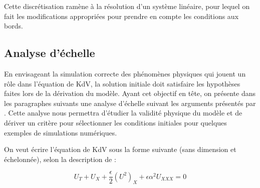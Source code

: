 \indent Cette discrétisation ramène à la résolution d'un système linéaire, pour lequel on fait les modifications appropriées pour prendre en compte les conditions aux bords.

%
%
%
%
%
%
%

\subsection{Analyse d'échelle}

\indent En envisageant la simulation correcte des phénomènes physiques qui jouent un rôle dans l'équation de KdV, la solution initiale doit satisfaire les hypothèses faites lors de la dérivation du modèle. Ayant cet objectif en tête, on présente dans les paragraphes suivants une analyse d'échelle suivant les arguments présentés par \cite{BBM1971}. Cette analyse nous permettra d'étudier la validité physique du modèle et de dériver un critère pour sélectionner les conditions initiales pour quelques exemples de simulations numériques.

\indent On veut écrire l'équation de KdV sous la forme suivante (sans dimension et échelonnée), selon la description de \cite{BBM1971} :

\begin{equation}
\label{eq:scaledKdV}
U_T + U_X + \frac{\epsilon}{2} (U^2)_X + \epsilon\alpha^2U_{XXX} = 0
\end{equation}

